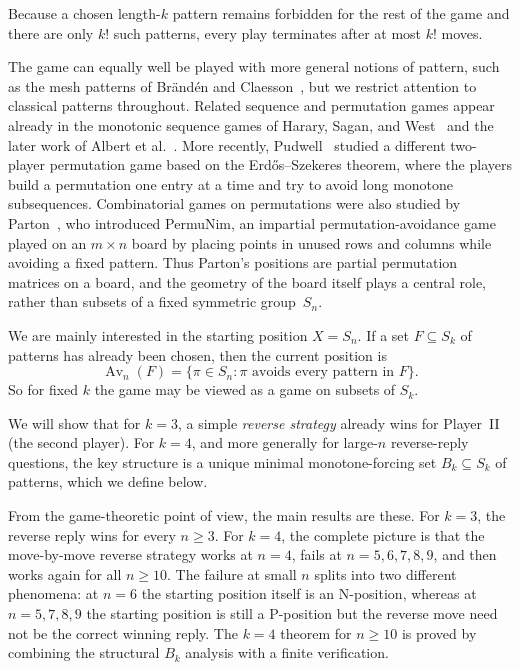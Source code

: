 \documentclass[11pt]{amsart}
\newcommand{\Sym}{S}
\newcommand{\Av}{\operatorname{Av}}
\theoremstyle{plain}
\theoremstyle{definition}
\theoremstyle{remark}
\begin{document}
Because a chosen length-$k$ pattern remains forbidden for the rest of the game and there are only
$k!$ such patterns, every play terminates after at most $k!$ moves.

The game can equally well be played with more general notions of pattern, such as the mesh
patterns of Br\"and\'en and Claesson~\cite{branden-claesson}, but we restrict attention to
classical patterns throughout.  Related sequence and permutation games appear already in the
monotonic sequence games of Harary, Sagan, and West~\cite{harary-sagan-west} and the later work
of Albert et al.~\cite{albert-monotonic}.  More recently, Pudwell~\cite{pudwell-erdos-szekeres}
studied a different two-player permutation game based on the Erd\H{o}s--Szekeres theorem, where the
players build a permutation one entry at a time and try to avoid long monotone subsequences.
Combinatorial games on permutations were also studied by Parton~\cite{parton}, who introduced
PermuNim, an impartial permutation-avoidance game played on an $m\times n$ board by placing points
in unused rows and columns while avoiding a fixed pattern.  Thus Parton's positions are partial
permutation matrices on a board, and the geometry of the board itself plays a central role, rather
than subsets of a fixed symmetric group~$\Sym_n$.

We are mainly interested in the starting position $X = \Sym_n$.  If a set
$F \subseteq \Sym_k$ of patterns has already been chosen, then the current position is
\[
  \Av_n(F)=\{\pi \in \Sym_n : \pi \text{ avoids every pattern in } F\}.
\]
So for fixed $k$ the game may be viewed as a game on subsets of $\Sym_k$.

We will show that for $k=3$, a simple \emph{reverse strategy} already wins for Player~II (the second
player).  For $k=4$, and more generally for large-$n$ reverse-reply questions, the key structure is
a unique minimal monotone-forcing set $B_k \subseteq \Sym_k$ of patterns, which we define below.

From the game-theoretic point of view, the main results are these.  For $k=3$, the reverse reply
wins for every $n \geq 3$.  For $k=4$, the complete picture is that the move-by-move reverse
strategy works at $n=4$, fails at $n=5,6,7,8,9$, and then works again for all $n \geq 10$.  The
failure at small $n$ splits into two different phenomena: at $n=6$ the starting position itself is
an N-position, whereas at $n=5,7,8,9$ the starting position is still a P-position but the
reverse move need not be the correct winning reply.  The $k=4$ theorem for $n \geq 10$ is proved by
combining the structural $B_k$ analysis with a finite verification.
\end{document}
